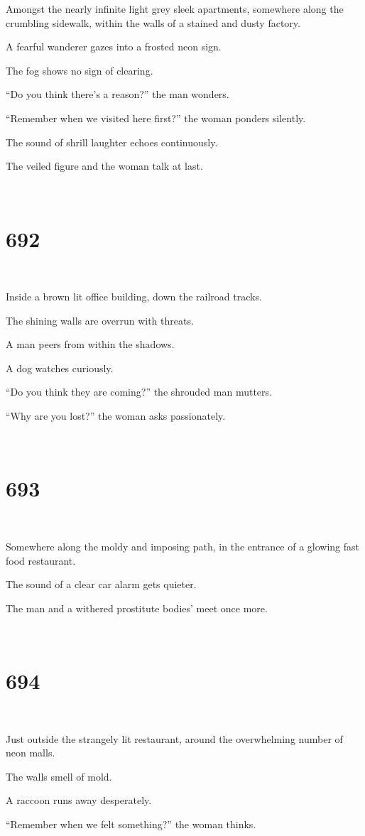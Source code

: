 \documentclass{report}
\begin{document}
Amongst the nearly infinite light grey sleek apartments, somewhere along the crumbling sidewalk, within the walls of a stained and dusty factory.

A fearful wanderer gazes into a frosted neon sign.

The fog shows no sign of clearing.

``Do you think there's a reason?'' the man wonders.

``Remember when we visited here first?'' the woman ponders silently.

The sound of shrill laughter echoes continuously.

The veiled figure and the woman talk at last.

~
\chapter*{692}
~

Inside a brown lit office building, down the railroad tracks.

The shining walls are overrun with threats.

A man peers from within the shadows.

A dog watches curiously.

``Do you think they are coming?'' the shrouded man mutters.

``Why are you lost?'' the woman asks passionately.

~
\chapter*{693}
~

Somewhere along the moldy and imposing path, in the entrance of a glowing fast food restaurant.

The sound of a clear car alarm gets quieter.

The man and a withered prostitute bodies' meet once more.

~
\chapter*{694}
~

Just outside the strangely lit restaurant, around the overwhelming number of neon malls.

The walls smell of mold.

A raccoon runs away desperately.

``Remember when we felt something?'' the woman thinks.
\end{document}

